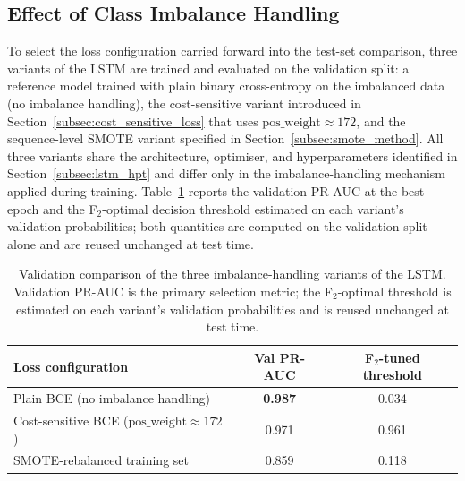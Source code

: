 \documentclass[oneside,12pt,parskip=half,american,numbers=noenddot]{scrreprt}
\begin{document}
\subsection{Effect of Class Imbalance Handling}
\label{subsec:smote}

To select the loss configuration carried forward into the test-set comparison, three variants of the LSTM are trained and evaluated on the validation split: a reference model trained with plain binary cross-entropy on the imbalanced data (no imbalance handling), the cost-sensitive variant introduced in Section~\ref{subsec:cost_sensitive_loss} that uses $\text{pos\_weight} \approx 172$, and the sequence-level SMOTE variant specified in Section~\ref{subsec:smote_method}. All three variants share the architecture, optimiser, and hyperparameters identified in Section~\ref{subsec:lstm_hpt} and differ only in the imbalance-handling mechanism applied during training. Table~\ref{tab:lstm_imbalance_val} reports the validation PR-AUC at the best epoch and the F$_2$-optimal decision threshold estimated on each variant's validation probabilities; both quantities are computed on the validation split alone and are reused unchanged at test time.

\begin{table}[H]
\centering
\caption{Validation comparison of the three imbalance-handling variants of the LSTM. Validation PR-AUC is the primary selection metric; the F$_2$-optimal threshold is estimated on each variant's validation probabilities and is reused unchanged at test time.}
\label{tab:lstm_imbalance_val}
\small
\renewcommand{\arraystretch}{1.2}
\begin{tabular}{lcc}
\hline
\textbf{Loss configuration} & \textbf{Val PR-AUC} & \textbf{F$_2$-tuned threshold} \\
\hline
Plain BCE (no imbalance handling) & \textbf{0.987} & 0.034 \\
Cost-sensitive BCE ($\text{pos\_weight} \approx 172$) & 0.971 & 0.961 \\
SMOTE-rebalanced training set & 0.859 & 0.118 \\
\hline
\end{tabular}
\end{table}
\end{document}
